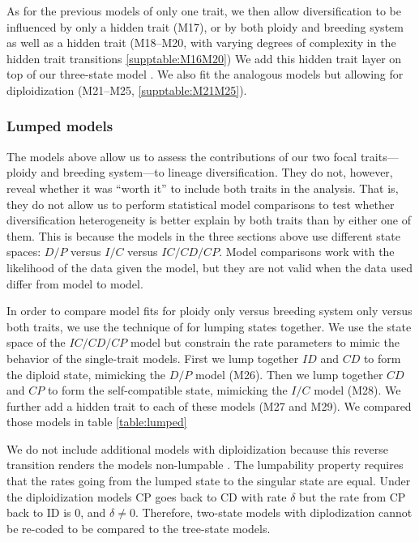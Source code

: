 As for the previous models of only one trait, we then allow diversification to be influenced by only a hidden trait (M17), or by both ploidy and breeding system as well as a hidden trait (M18--M20, with varying degrees of complexity in the hidden trait transitions \cref{supptable:M16M20})
We add this hidden trait layer on top of our three-state model \citep[similar to][]{caetano_2018, huang_2018}.
We also fit the analogous models but allowing for diploidization (M21--M25, \cref{supptable:M21M25}).

\subsubsection{Lumped models}

The models above allow us to assess the contributions of our two focal traits---ploidy and breeding system---to lineage diversification.
They do not, however, reveal whether it was ``worth it'' to include both traits in the analysis.
That is, they do not allow us to perform statistical model comparisons to test whether diversification heterogeneity is better explain by both traits than by either one of them.
This is because the models in the three sections above use different state spaces: $D/P$ versus $I/C$ versus $IC/CD/CP$.
Model comparisons work with the likelihood of the data given the model, but they are not valid when the data used differ from model to model.

In order to compare model fits for ploidy only versus breeding system only versus both traits, we use the technique of \citet{tarasov_2019} for lumping states together.
We use the state space of the $IC/CD/CP$ model but constrain the rate parameters to mimic the behavior of the single-trait models.
First we lump together $ID$ and $CD$ to form the diploid state, mimicking the $D/P$ model (M26).
Then we lump together $CD$ and $CP$ to form the self-compatible state, mimicking the $I/C$ model (M28).
We further add a hidden trait to each of these models (M27 and M29).
We compared those models in table \cref{table:lumped}


We do not include additional models with diploidization because this reverse transition renders the models non-lumpable \citep{tarasov_2019}. The lumpability property requires that the rates going from the lumped state to the singular state are equal. Under the diploidization models CP goes back to CD with rate $\delta$ but the rate from CP back to ID is 0, and $\delta \neq 0$. Therefore, two-state models with diplodization cannot be re-coded to be compared to the tree-state models. 

